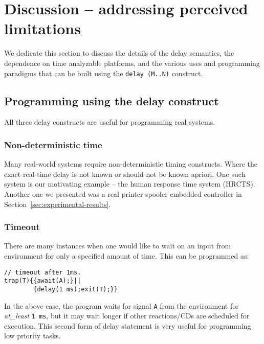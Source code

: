 \section{Discussion -- addressing perceived limitations}
\label{sec:disc-perc-limit}

We dedicate this section to discuss the details of the delay semantics,
the dependence on time analyzable platforms, and the various uses and
programming paradigms that can be built using the \texttt{delay (M..N)}
construct.

\subsection{Programming using the delay construct}
\label{sec:progr-using-delay}

All three delay constructs are useful for programming real systems. %

\subsubsection{Non-deterministic time}
\label{sec:non-determ-time}

Many real-world systems require non-deterministic timing
constructs. Where the exact real-time delay is not known or should not
be known apriori. One such system is our motivating example -- the human
response time system (HRCTS). Another one we presented was a real
printer-spooler embedded controller in
Section~\ref{sec:experimental-results}.

\subsubsection{Timeout}
\label{sec:timeout}

There are many instances when one would like to wait on an input from
environment for only a specified amount of time. This can be programmed
as:
\begin{verbatim}
// timeout after 1ms.
trap(T){{await(A);}||
        {delay(1 ms);exit(T);}}
\end{verbatim}

In the above case, the program waits for signal \texttt{A} from the
environment for \textit{at\_least} \texttt{1 ms}, but it may wait longer
if other reactions/CDs are scheduled for execution. This second form of
delay statement is very useful for programming low priority tasks.

